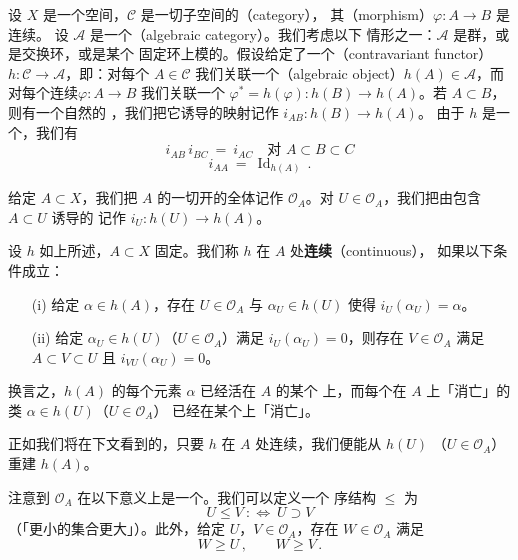 设 $X$ 是一个\trTopology{}空间，$\mathcal{C}$ 是一切子空间的\textbf{\trCategoryTheory}（category），
其\textbf{\trMorphism}（morphism）$\varphi\colon A\to B$ 是连续\trMapping。
设 $\mathcal{A}$ 是一个\textbf{\trAlgebraicCategory}（algebraic category）。我们考虑以下
情形之一：$\mathcal{A}$ 是\trAbelian{}群\trCategoryTheory，或是交换环\trCategoryTheory，或是某个
固定环上模的\trCategoryTheory。假设给定了一个\textbf{\trContravariant\trFunctor}（contravariant functor）
$h\colon\mathcal{C}\to\mathcal{A}$，即：对每个 $A\in\mathcal{C}$ 我们关联一个\textbf{\trAlgebraicObject}（algebraic
object）$h(A)\in\mathcal{A}$，而对每个连续\trMapping{}$\varphi\colon A\to B$ 我们关联一个%
\trHomomorphism $\varphi^{*}=h(\varphi)\colon h(B)\to h(A)$。若 $A\subset B$，则有一个自然的%
\trInclusionMapping，我们把它诱导的映射记作 $i_{AB}\colon h(B)\to h(A)$。
由于 $h$ 是一个\trContravariant\trFunctor，我们有
\[i_{AB}\,i_{BC}\ =\ i_{AC}\quad\text{对 }A\subset B\subset C
\]
\[i_{AA}\ =\ \operatorname{Id}_{h(A)}\,.
\]

给定 $A\subset X$，我们把 $A$ 的一切开\trNeighborhood{}的全体记作
$\mathcal{O}_{A}$。对 $U\in\mathcal{O}_{A}$，我们把由包含 $A\subset U$ 诱导的%
\trHomomorphism{}记作 $i_{U}\colon h(U)\to h(A)$。

\begin{definition}\label{def:a8-continuity}
设 $h$ 如上所述，$A\subset X$ 固定。我们称 $h$ 在 $A$ 处\textbf{连续}（continuous），
如果以下条件成立：
\begin{enumerate}
\item[(i)] 给定 $\alpha\in h(A)$，存在 $U\in\mathcal{O}_{A}$ 与
$\alpha_{U}\in h(U)$ 使得 $i_{U}(\alpha_{U})=\alpha$。
\item[(ii)] 给定 $\alpha_{U}\in h(U)$（$U\in\mathcal{O}_{A}$）满足
$i_{U}(\alpha_{U})=0$，则存在 $V\in\mathcal{O}_{A}$ 满足 $A\subset V\subset U$
且 $i_{VU}(\alpha_{U})=0$。
\end{enumerate}
\end{definition}

换言之，$h(A)$ 的每个元素 $\alpha$ 已经活在 $A$ 的某个\trNeighborhood{}
上，而每个在 $A$ 上「消亡」的类 $\alpha\in h(U)$（$U\in\mathcal{O}_{A}$）
已经在某个\trNeighborhood{}上「消亡」。

正如我们将在下文看到的，只要 $h$ 在 $A$ 处连续，我们便能从 $h(U)$
（$U\in\mathcal{O}_{A}$）重建 $h(A)$。

注意到 $\mathcal{O}_{A}$ 在以下意义上是一个\trDirectedSet。我们可以定义一个
序结构 $\leq$ 为
\[U\leq V\ :\Longleftrightarrow\ U\supset V
\]
（「更小的集合更大」）。此外，给定 $U$，$V\in\mathcal{O}_{A}$，存在
$W\in\mathcal{O}_{A}$ 满足
\[W\geq U\,,\qquad W\geq V\,.
\]


